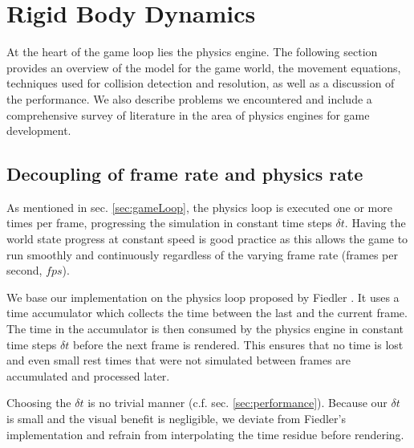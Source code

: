 \section{Rigid Body Dynamics}

At the heart of the game loop lies the physics engine.
The following section provides an overview of the model for the game world, the movement equations, techniques used for collision detection and resolution, as well as a discussion of the performance.
We also describe problems we encountered and include a comprehensive survey of literature in the area of physics engines for game development.

\subsection{Decoupling of frame rate and physics rate}\label{sec:decoupling}
As mentioned in sec. \ref{sec:gameLoop}, the physics loop is executed one or more times per frame, progressing the simulation in constant time steps $\delta t$.
Having the world state progress at constant speed is good practice as this allows the game to run smoothly and continuously regardless of the varying frame rate (frames per second, $fps$).

We base our implementation on the physics loop proposed by Fiedler \cite{gafferTimestep}.
It uses a time accumulator which \glqq collects\grqq{} the time between the last and the current frame.
The time in the accumulator is then consumed by the physics engine in constant time steps $\delta t$ before the next frame is rendered.
This ensures that no time is lost and even small rest times that were not simulated between frames are accumulated and processed later.

Choosing the $\delta t$ is no trivial manner (c.f. sec. \ref{sec:performance}).
Because our $\delta t$ is small and the visual benefit is negligible, we deviate from Fiedler's implementation \cite{gafferTimestep} and refrain from interpolating the time residue before rendering.

